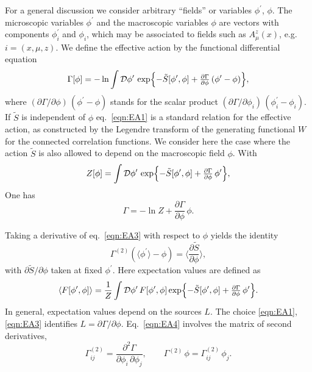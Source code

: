 \documentclass[twocolumn,aps,prd,amsmath,amssymb,preprintnumbers,longbibliography]{revtex4-1}
\numberwithin{equation}{section}
\begin{document}
\begin{appendices}
For a general discussion we consider arbitrary ``fields'' or variables $\phi^\prime$, $\phi$. The microscopic variables $\phi^\prime$ and the macroscopic variables $\phi$ are vectors with components $\phi_i^\prime$ and $\phi_i$, which may be associated to fields such as $A_\mu^z(x)$, e.g. $i = (x,\mu,z)$. We define the effective action by the functional differential equation
\begin{equation}\label{eqn:EA1}
	\Gamma[\phi]
	= -\ln \int \mathcal{D} \phi^\prime \, \exp\Bigl\{-\tilde{S}[\phi^\prime,\phi] + \tfrac{\partial \Gamma}{\partial \phi} \, (\phi^\prime - \phi)\Bigr\},
\end{equation}
where $(\partial \Gamma/\partial \phi) \, (\phi^\prime - \phi)$ stands for the scalar product $(\partial \Gamma/\partial \phi_i) \, (\phi_i^\prime - \phi_i)$. If $\tilde{S}$ is independent of $\phi$ eq.~\eqref{eqn:EA1} is a standard relation for the effective action, as constructed by the Legendre transform of the generating functional $W$ for the connected correlation functions. We consider here the case where the action $\tilde{S}$ is also allowed to depend on the macroscopic field $\phi$. With
\begin{equation}\label{eqn:EA2}
	Z[\phi]
	= \int \mathcal{D} \phi^\prime \, \exp\Bigl\{-\tilde{S}[\phi^\prime,\phi] + \tfrac{\partial \Gamma}{\partial \phi} \, \phi^\prime\Bigr\},
\end{equation}
One has
\begin{equation}\label{eqn:EA3}
	\Gamma
	= -\ln Z + \frac{\partial \Gamma}{\partial \phi} \, \phi.
\end{equation}

Taking a derivative of eq.~\eqref{eqn:EA3} with respect to $\phi$ yields the identity
\begin{equation}\label{eqn:EA4}
	\Gamma^{(2)}(\langle\phi^\prime\rangle - \phi)
	= \biggl\langle\frac{\partial \tilde{S}}{\partial \phi}\biggr\rangle,
\end{equation}
with $\partial \tilde{S}/\partial \phi$ taken at fixed $\phi^\prime$. Here expectation values are defined as
\begin{equation}\label{eqn:EA5}
	\langle F[\phi^\prime,\phi]\rangle
	= \frac{1}{Z} \int \mathcal{D} \phi^\prime \, F[\phi^\prime,\phi] \exp\Bigl\{-\tilde{S}[\phi^\prime,\phi] + \tfrac{\partial \Gamma}{\partial \phi} \, \phi^\prime\Bigr\}.
\end{equation}
In general, expectation values depend on the sources $L$. The choice \eqref{eqn:EA1}, \eqref{eqn:EA3} identifies $L = \partial \Gamma/\partial \phi$. Eq.~\eqref{eqn:EA4} involves the matrix of second derivatives,
\begin{equation}\label{eqn:EA6}
	\Gamma_{ij}^{(2)}
	= \frac{\partial^2 \Gamma}{\partial \phi_i \, \partial \phi_j},
	\qquad
	\Gamma^{(2)} \, \phi
	= \Gamma_{ij}^{(2)} \, \phi_j.
\end{equation}


\end{appendices}
\end{document}
